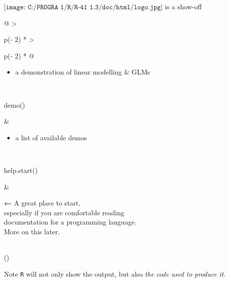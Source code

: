 \documentclass[
  ignorenonframetext,
]{beamer}
\newenvironment{Shaded}{\begin{snugshade}}{\end{snugshade}}
\newcommand{\FunctionTok}[1]{\textcolor[rgb]{0.00,0.00,0.00}{#1}}
\newcommand{\NormalTok}[1]{#1}
\providecommand{\tightlist}{%
  \setlength{\itemsep}{0pt}\setlength{\parskip}{0pt}}
\begin{document}
\begin{frame}[fragile]{\(\texttt{[image: C:/PROGRA~1/R/R-41~1.3/doc/html/logo.jpg]}\)
is a show-off}
\begin{longtable}[]{@{}
  >{\raggedright\arraybackslash}p{(\columnwidth - 2\tabcolsep) * }
  >{\raggedright\arraybackslash}p{(\columnwidth - 2\tabcolsep) * }@{}}
\begin{minipage}[t]{\linewidth}
\begin{itemize}
\tightlist
\item
  a demonstration of linear modelling \& GLMs
\end{itemize}
\end{minipage} \\
\begin{minipage}[t]{\linewidth}\raggedright
\begin{Shaded}
\begin{Highlighting}[]
\FunctionTok{demo}\NormalTok{()}
\end{Highlighting}
\end{Shaded}
\end{minipage} & \begin{minipage}[t]{\linewidth}\raggedright
\begin{itemize}
\tightlist
\item
  a list of available demos
\end{itemize}
\end{minipage} \\
\begin{minipage}[t]{\linewidth}\raggedright
\begin{Shaded}
\begin{Highlighting}[]
\FunctionTok{help.start}\NormalTok{()}
\end{Highlighting}
\end{Shaded}
\end{minipage} & \begin{minipage}[t]{\linewidth}\raggedright
\hfill\break
\textbf{←} A great place to start,\\
\hspace*{0.333em}\hspace*{0.333em}\hspace*{0.333em}\hspace*{0.333em}especially
if you are comfortable reading\\
\hspace*{0.333em}\hspace*{0.333em}\hspace*{0.333em}\hspace*{0.333em}documentation
for a programming language.\\
\hspace*{0.333em}\hspace*{0.333em}\hspace*{0.333em}\hspace*{0.333em}More
on this later.
\end{minipage} \\
\bottomrule()
\end{longtable}

\begin{block}{Note}
\protect\hypertarget{note}{}
\texttt{R}{} will not only show the output, but also \emph{the code used
to produce it}.
\end{block}
\end{frame}
\end{document}
